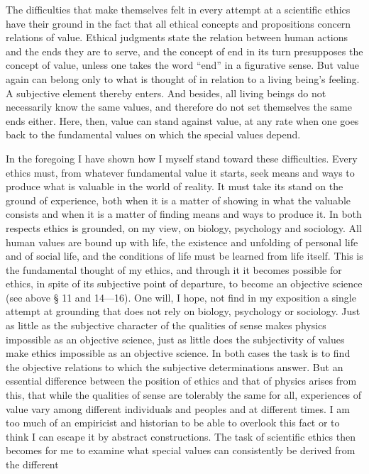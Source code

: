 \documentclass[12pt,a4paper,openany]{book}
\newcommand{\opage}[1]{\marginnote{\footnotesize\textit{[#1]}}}
\begin{document}
The difficulties that make themselves felt in every attempt at a scientific ethics have their ground
in the fact that all ethical concepts and propositions concern relations of value. Ethical judgments
state the relation between human actions and the ends they are to serve, and the concept of end in its
turn presupposes the concept of value, unless one takes the word ``end'' in a figurative sense. But
value again can belong only to what is thought of in relation to a living being's feeling. A subjective
element thereby enters. And besides, all living beings do not necessarily know the same values, and
therefore do not set themselves the same ends either. Here, then, value can stand against value, at any
rate when one goes back to the fundamental values on which the special values depend.

In the foregoing I have shown how I myself stand toward these difficulties. Every ethics must, from
whatever fundamental value it starts, seek means and ways to produce what is valuable in the world of
reality. It must take its stand on the ground of experience, both when it is a matter of showing in
what the valuable consists and when it is a matter of finding means and ways to produce it. In both
respects ethics is grounded, on my view, on biology, psychology and sociology. All human values are
bound up with life, the existence and unfolding of personal life and of social life, and the
conditions of life must be learned from life itself. This is the fundamental thought of my ethics,
and through it it becomes possible for ethics, in spite of its subjective point of departure, to
become an objective science (see above § 11 and 14---16). One will, I hope, not find in my exposition
a single attempt at grounding that does not rely on biology, psychology or sociology. Just as little as
the subjective character of the qualities of sense makes physics impossible as an objective science,
just as little does the subjectivity of values make ethics impossible as an objective science. In
both cases the task is to find the objective relations to which the subjective determinations answer.
But an essential difference between the position of ethics and that of physics arises from this,
that while the qualities
\opage{68}of sense are tolerably the same for all, experiences of value vary among different individuals and
peoples and at different times. I am too much of an empiricist and historian to be able to overlook
this fact or to think I can escape it by abstract constructions. The task of scientific ethics then
becomes for me to examine what special values can consistently be derived from the different
\end{document}
